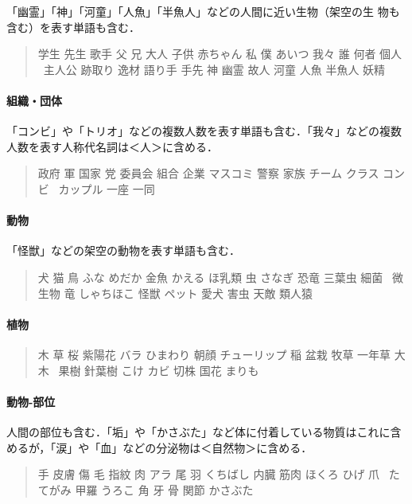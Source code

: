 \documentclass[a4j,titlepage]{jarticle}
\begin{document}
「幽霊」「神」「河童」「人魚」「半魚人」などの人間に近い生物（架空の生
物も含む）を表す単語も含む．

\begin{quote}
学生 先生 歌手 父 兄 大人 子供 赤ちゃん 私 僕 あいつ 我々 誰 何者 個人
\ 主人公 跡取り 逸材 語り手 手先 神 幽霊 故人 河童 人魚 半魚人 妖精
\end{quote}

\paragraph{組織・団体}

「コンビ」や「トリオ」などの複数人数を表す単語も含む．「我々」などの複数
人数を表す人称代名詞は＜人＞に含める．

\begin{quote}
政府 軍 国家 党 委員会 組合 企業 マスコミ 警察 家族 チーム クラス コンビ
\ カップル 一座 一同
\end{quote}

\paragraph{動物}

「怪獣」などの架空の動物を表す単語も含む．

\begin{quote}
犬 猫 鳥 ふな めだか 金魚 かえる ほ乳類 虫 さなぎ 恐竜 三葉虫 細菌 
\ 微生物 竜 しゃちほこ 怪獣 ペット 愛犬 害虫 天敵 類人猿
\end{quote}

\paragraph{植物}

\begin{quote}
木 草 桜 紫陽花 バラ ひまわり 朝顔 チューリップ 稲 盆栽 牧草 一年草 大木
\ 果樹 針葉樹 こけ カビ 切株 国花 まりも
\end{quote}

\paragraph{動物-部位}

人間の部位も含む．「垢」や「かさぶた」など体に付着している物質はこれに含
めるが，「涙」や「血」などの分泌物は＜自然物＞に含める．

\begin{quote}
手 皮膚 傷 毛 指紋 肉 アラ 尾 羽 くちばし 内臓 筋肉 ほくろ ひげ 爪 
\ たてがみ 甲羅 うろこ 角 牙 骨 関節 かさぶた
\end{quote}
\end{document}
